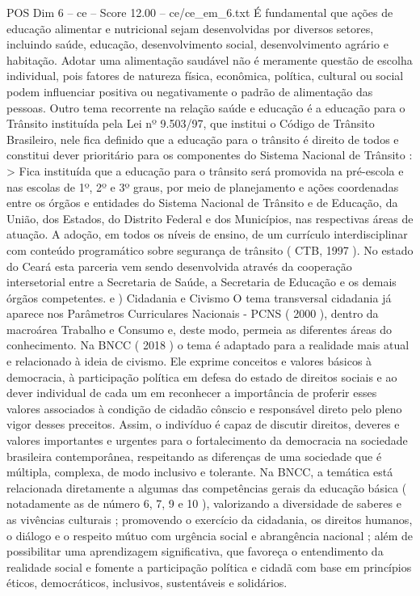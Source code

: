 \begin{textsample}{POS Dim 6 – ce – Score 12.00 – ce/ce\_em\_6.txt}
É fundamental que ações de educação alimentar e nutricional sejam desenvolvidas por diversos setores, incluindo saúde, educação, desenvolvimento social, desenvolvimento agrário e habitação.
Adotar uma alimentação saudável não é meramente questão de escolha individual, pois fatores de natureza física, econômica, política, cultural ou social podem influenciar positiva ou negativamente o padrão de alimentação das pessoas.
Outro tema recorrente na relação saúde e educação é a educação para o Trânsito instituída pela Lei nº 9.503/97, que institui o Código de Trânsito Brasileiro, nele fica definido que a educação para o trânsito é direito de todos e constitui dever prioritário para os componentes do Sistema Nacional de Trânsito : > Fica instituída que a educação para o trânsito será promovida na pré-escola e nas escolas de 1º, 2º e 3º graus, por meio de planejamento e ações coordenadas entre os órgãos e entidades do Sistema Nacional de Trânsito e de Educação, da União, dos Estados, do Distrito Federal e dos Municípios, nas respectivas áreas de atuação.
A adoção, em todos os níveis de ensino, de um currículo interdisciplinar com conteúdo programático sobre segurança de trânsito ( CTB, 1997 ).
No estado do Ceará esta parceria vem sendo desenvolvida através da cooperação intersetorial entre a Secretaria de Saúde, a Secretaria de Educação e os demais órgãos competentes. e ) Cidadania e Civismo O tema transversal cidadania já aparece nos Parâmetros Curriculares Nacionais - PCNS ( 2000 ), dentro da macroárea Trabalho e Consumo e, deste modo, permeia as diferentes áreas do conhecimento.
Na BNCC ( 2018 ) o tema é adaptado para a realidade mais atual e relacionado à ideia de civismo.
Ele exprime conceitos e valores básicos à democracia, à participação política em defesa do estado de direitos sociais e ao dever individual de cada um em reconhecer a importância de proferir esses valores associados à condição de cidadão cônscio e responsável direto pelo pleno vigor desses preceitos.
Assim, o indivíduo é capaz de discutir direitos, deveres e valores importantes e urgentes para o fortalecimento da democracia na sociedade brasileira contemporânea, respeitando as diferenças de uma sociedade que é múltipla, complexa, de modo inclusivo e tolerante.
Na BNCC, a temática está relacionada diretamente a algumas das competências gerais da educação básica ( notadamente as de número 6, 7, 9 e 10 ), valorizando a diversidade de saberes e as vivências culturais ; promovendo o exercício da cidadania, os direitos humanos, o diálogo e o respeito mútuo com urgência social e abrangência nacional ; além de possibilitar uma aprendizagem significativa, que favoreça o entendimento da realidade social e fomente a participação política e cidadã com base em princípios éticos, democráticos, inclusivos, sustentáveis e solidários.

\end{textsample}
